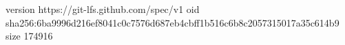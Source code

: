 version https://git-lfs.github.com/spec/v1
oid sha256:6ba9996d216ef8041c0c7576d687eb4cbff1b516c6b8c2057315017a35c614b9
size 174916
